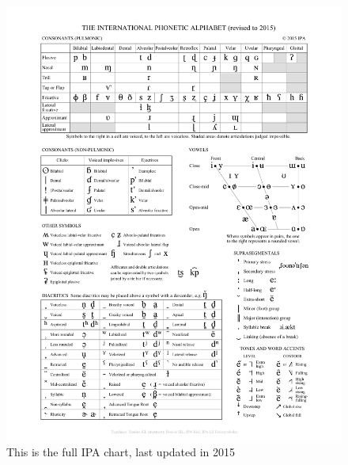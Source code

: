
\begin{figure}[h]
\vspace*{-1.5cm}
    \begin{center}
    \hspace*{-2cm}
      \includegraphics[width=1.3\linewidth]{ipa_chart.pdf}
    \end{center}
    \caption[Full IPA chart]{This is the full IPA chart, last updated in 2015}
    \label{fig:ipa_chart}
  \end{figure}



